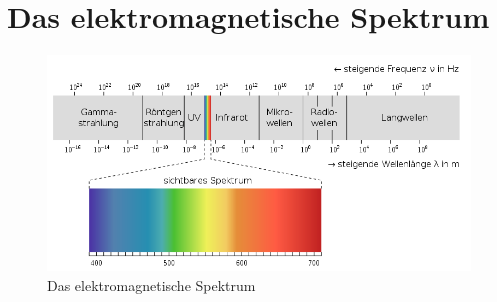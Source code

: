 

\section{Das elektromagnetische Spektrum}


\begin{figure}[h]
    \centering
    \includegraphics[width=\linewidth]{Bilder/Emspekt.PNG}
    \caption{Das elektromagnetische Spektrum\protect\footnotemark}
\end{figure}
